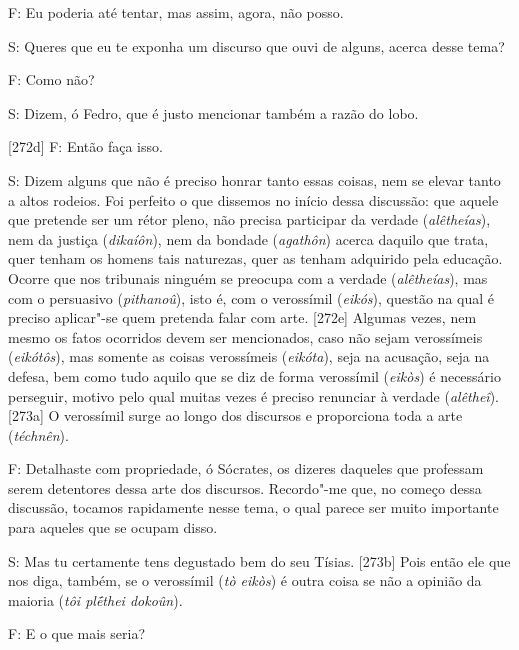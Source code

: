  

F: Eu poderia até tentar, mas assim, agora, não posso.

 

S: Queres que eu te exponha um discurso que ouvi de alguns, acerca desse
tema?

 

F: Como não?

 

S: Dizem, ó Fedro, que é justo mencionar também a razão do lobo.

 

[272d] F: Então faça isso.

 

S: Dizem alguns que não é preciso honrar tanto essas coisas, nem se
elevar tanto a altos rodeios. Foi perfeito o que dissemos no início
dessa discussão: que aquele que pretende ser um rétor pleno, não precisa
participar da verdade (\emph{alêtheías}), nem da justiça
(\emph{dikaíôn}), nem da bondade (\emph{agathôn}) acerca daquilo que
trata, quer tenham os homens tais naturezas, quer as tenham adquirido
pela educação. Ocorre que nos tribunais ninguém se preocupa com a
verdade (\emph{alêtheías}), mas com o persuasivo (\emph{pithanoû}), isto
é, com o verossímil (\emph{eikós}), questão na qual é preciso aplicar"-se
quem pretenda falar com arte. [272e] Algumas vezes, nem mesmo os
fatos ocorridos devem ser mencionados, caso não sejam verossímeis
(\emph{eikótôs}), mas somente as coisas verossímeis (\emph{eikóta}),
seja na acusação, seja na defesa, bem como tudo aquilo que se diz de
forma verossímil (\emph{eikòs}) é necessário perseguir, motivo pelo qual
muitas vezes é preciso renunciar à verdade (\emph{alêtheî}). [273a]
O verossímil surge ao longo dos discursos e proporciona toda a arte
(\emph{téchnên}).

 

F: Detalhaste com propriedade, ó Sócrates, os dizeres daqueles que
professam serem detentores dessa arte dos discursos. Recordo"-me que, no
começo dessa discussão, tocamos rapidamente nesse tema, o qual parece
ser muito importante para aqueles que se ocupam disso.

 

S: Mas tu certamente tens degustado bem do seu Tísias. [273b] Pois
então ele que nos diga, também, se o verossímil (\emph{tò eikòs}) é
outra coisa se não a opinião da maioria (\emph{tôi plḗthei dokoûn}).

 

F: E o que mais seria?

